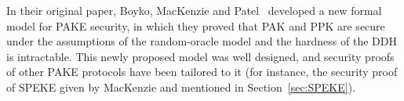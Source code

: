 In their original paper, Boyko, MacKenzie and Patel~\cite{BoMaPa00} developed a new formal model for PAKE
security, in which they proved that PAK and PPK are secure under the assumptions of the random-oracle model and
the hardness of the DDH is intractable. This newly proposed model was well designed, and security proofs of other
PAKE protocols have been tailored to it (for instance, the security proof of SPEKE given by MacKenzie\cite{Mac01} 
and mentioned in Section~\ref{sec:SPEKE}).












